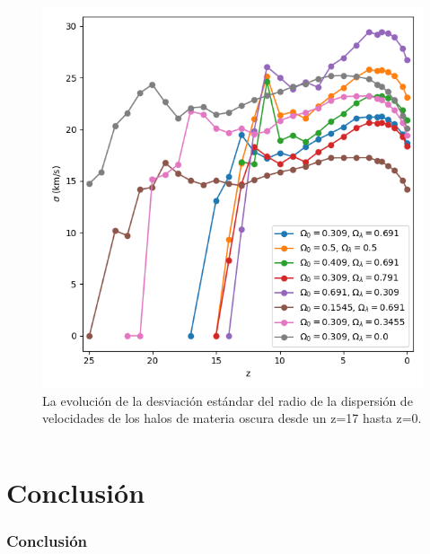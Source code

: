 \documentclass{beamer}
\begin{document}
\begin{frame}
\begin{columns}[t]
			\begin{column}{.5\textwidth}
				\begin{figure}
					\centering
					\includegraphics[scale=0.3]{Conc/VelDisp_Std_Conc.png}
					\caption{\footnotesize La evolución de la desviación estándar del radio de la dispersión de velocidades de los halos de materia oscura desde un z=17 hasta z=0.}
					\label{fig:Conc-VelDispStd}
				\end{figure}
			\end{column}
		\end{columns}

	\end{frame}	






\section{Conclusión}
	\begin{frame}
		\frametitle{Conclusión}


	\end{frame}
\end{document}
